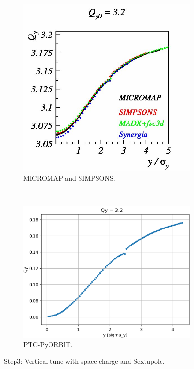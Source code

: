 \documentclass[a4paper]{cernatsnote}
\begin{document}
\begin{figure}
        \centering
        \begin{subfigure}{.5\textwidth}
          \centering
          \includegraphics[width=\textwidth]{Step3_tune_y.png}
          \caption{MICROMAP and SIMPSONS.}
          \label{fig:step3V_m}
        \end{subfigure}~~~~~~
        \begin{subfigure}{.5\textwidth}
          \centering
          \includegraphics[width=\textwidth]{Step3_tune_y_PO.png}
          \caption{PTC-PyORBIT.}
          \label{fig:step3V_po}
        \end{subfigure}
        \caption{Step3: Vertical tune with space charge and Sextupole.}
        \label{fig:step3V}
\end{figure}
\end{document}
